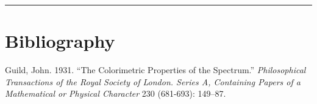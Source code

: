 \documentclass[
]{article}
\newlength{\cslhangindent}
\newlength{\cslentryspacingunit} %
\newenvironment{CSLReferences}[2] %
 {%
  \setlength{\parindent}{0pt}
  \ifodd #1
  \let\oldpar\par
  \def\par{\hangindent=\cslhangindent\oldpar}
  \fi
  \setlength{\parskip}{\cslentryspacingunit}
 }%
 {}
\begin{document}
\begin{center}\rule{0.5\linewidth}{0.5pt}\end{center}

\hypertarget{bibliography}{%
\section*{Bibliography}\label{bibliography}}

\hypertarget{refs}{}
\begin{CSLReferences}{1}{0}
\leavevmode{}%
Guild, John. 1931. {``The Colorimetric Properties of the Spectrum.''}
\emph{Philosophical Transactions of the Royal Society of London. Series
A, Containing Papers of a Mathematical or Physical Character} 230
(681-693): 149--87.

\end{CSLReferences}
\end{document}
